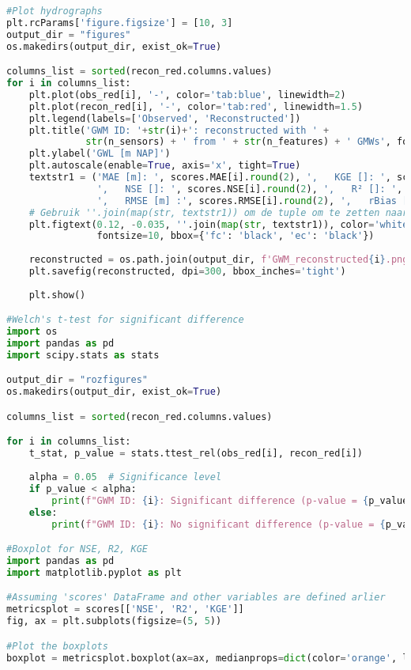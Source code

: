 \begin{lstlisting}[language=Python]
#Plot hydrographs 
plt.rcParams['figure.figsize'] = [10, 3]
output_dir = "figures"
os.makedirs(output_dir, exist_ok=True)

columns_list = sorted(recon_red.columns.values)
for i in columns_list:
    plt.plot(obs_red[i], '-', color='tab:blue', linewidth=2)
    plt.plot(recon_red[i], '-', color='tab:red', linewidth=1.5)
    plt.legend(labels=['Observed', 'Reconstructed'])
    plt.title('GWM ID: '+str(i)+': reconstructed with ' +
              str(n_sensors) + ' from ' + str(n_features) + ' GMWs', fontsize=12)
    plt.ylabel('GWL [m NAP]')
    plt.autoscale(enable=True, axis='x', tight=True)
    textstr1 = ('MAE [m]: ', scores.MAE[i].round(2), ',   KGE []: ', scores.KGE[i].round(2),
                ',   NSE []: ', scores.NSE[i].round(2), ',   R² []: ', scores.R2[i].round(2),
                ',   RMSE [m] :', scores.RMSE[i].round(2), ',   rBias [%] :', scores.rBias[i].round(3))
    # Gebruik ''.join(map(str, textstr1)) om de tuple om te zetten naar een string
    plt.figtext(0.12, -0.035, ''.join(map(str, textstr1)), color='white',
                fontsize=10, bbox={'fc': 'black', 'ec': 'black'})
    
    reconstructed = os.path.join(output_dir, f'GWM_reconstructed{i}.png')
    plt.savefig(reconstructed, dpi=300, bbox_inches='tight')
  
    plt.show()

#Welch's t-test for significant difference 
import os
import pandas as pd
import scipy.stats as stats

output_dir = "rozfigures"
os.makedirs(output_dir, exist_ok=True)

columns_list = sorted(recon_red.columns.values)

for i in columns_list:
    t_stat, p_value = stats.ttest_rel(obs_red[i], recon_red[i])
    
    alpha = 0.05  # Significance level
    if p_value < alpha:
        print(f"GWM ID: {i}: Significant difference (p-value = {p_value:.3f})")
    else:
        print(f"GWM ID: {i}: No significant difference (p-value = {p_value:.3f})")

#Boxplot for NSE, R2, KGE 
import pandas as pd 
import matplotlib.pyplot as plt 

#Assuming 'scores' DataFrame and other variables are defined arlier 
metricsplot = scores[['NSE', 'R2', 'KGE']]
fig, ax = plt.subplots(figsize=(5, 5))

#Plot the boxplots 
boxplot = metricsplot.boxplot(ax=ax, medianprops=dict(color='orange', linewidth=2))


\end{lstlisting}

